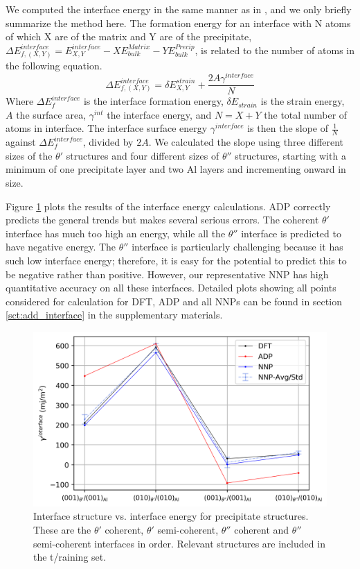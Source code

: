 \documentclass{article}
\begin{document}
We computed the interface energy in the same manner as in \cite{Vaithyanathan2004MultiscaleAlloys}, and we only briefly summarize the method here.
The formation energy for an interface with N atoms of which X are of the matrix and Y are of the precipitate,
$\Delta E^{interface}_{f, (X,Y)} = E^{interface}_{X,Y}-XE^{Matrix}_{bulk}-YE^{Precip}_{bulk}$,
is related to the number of atoms in the following equation. 
\begin{equation}
\Delta E^{interface}_{f,(X,Y)} = \delta E^{strain}_{X,Y} + \frac{2A\gamma^{interface}}{N}
\end{equation}
Where $\Delta E^{interface}_f$ is the interface formation energy, $\delta E_{strain}$ is the strain energy, $A$ the surface area,
$\gamma^{int}$ the interface energy, and $N=X+Y$ the total number of atoms in interface.
The interface surface energy $\gamma^{interface}$ is then the slope of $\frac{1}{N}$ against
$\Delta E^{interface}_f$, divided by $2A$.
We calculated the slope using three different sizes of the $\theta'$ structures and four different sizes of $\theta''$ structures, starting with a minimum of one precipitate layer and two Al layers and incrementing onward in size. 




Figure \ref{fig:interface_energies} plots the results of the interface energy calculations.
ADP correctly predicts the general trends but makes several serious errors.
The coherent $\theta'$ interface has much too high an energy, while all the $\theta''$ interface is predicted to have negative energy.
The $\theta''$ interface is particularly challenging because it has such low interface energy; therefore, it is easy for the potential to predict this to be negative rather than positive.
However, our representative NNP has high quantitative accuracy on all these interfaces.
Detailed plots showing all points considered for calculation for DFT, ADP and all NNPs can be found in section \ref{sct:add_interface} in the supplementary materials.

\begin{figure}[H]%
\centering%
\includegraphics[width=1\textwidth,center]{./figures/interface_energies.png}%
\caption{Interface structure vs. interface energy for precipitate structures. 
These are the $\theta'$ coherent, $\theta'$ semi-coherent, $\theta''$ coherent and $\theta''$ semi-coherent
interfaces in order. Relevant structures are included in the t/raining set.}%
\label{fig:interface_energies}
\end{figure}
\end{document}
